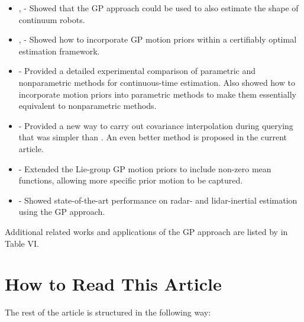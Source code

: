 \begin{itemize}
\item \citet{lilge_ijrr22}, \citet{lilge_tro25} - Showed that the \ac{GP} approach could be used to also estimate the shape of continuum robots.
\item \citet{duembgen_ral23}, \citet{barfoot_ijrr25} - Showed how to incorporate \ac{GP} motion priors within a certifiably optimal estimation framework.
\item \citet{johnson_arxiv24} - Provided a detailed experimental comparison of parametric and nonparametric methods for continuous-time estimation.  Also showed how to incorporate motion priors into parametric methods to make them essentially equivalent to nonparametric methods.
\item \citet{barfoot_ser24} - Provided a new way to carry out covariance interpolation during querying that was simpler than \citet{anderson_phd16}.  An even better method is proposed in the current article.
\item \citet{lilge_rob25} - Extended the Lie-group \ac{GP} motion priors to include non-zero mean functions, allowing more specific prior motion to be captured.
\item \citet{burnett_tro25} - Showed state-of-the-art performance on radar- and lidar-inertial estimation using the \ac{GP} approach.
\end{itemize}
Additional related works and applications of the \ac{GP} approach are listed by \citet{talbot_tro25} in Table VI.

\section{How to Read This Article}

The rest of the article is structured in the following way:

